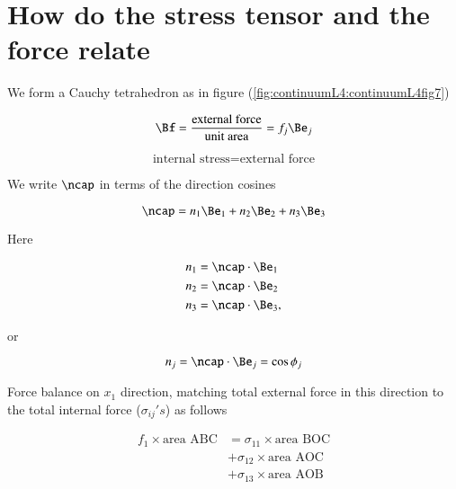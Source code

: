\section{How do the stress tensor and the force relate}

We form a Cauchy tetrahedron as in figure (\ref{fig:continuumL4:continuumL4fig7})

\begin{equation}\label{eqn:continuumL4:150}
\Bf = \frac{\text{external force}}{\text{unit area}} = f_j \Be_j
\end{equation}

\begin{equation}\label{eqn:continuumL4:170}
\text{internal stress} = \text{external force}
\end{equation}

We write $\ncap$ in terms of the direction cosines

\begin{equation}\label{eqn:continuumL4:190}
\ncap = 
n_1 \Be_1 + 
n_2 \Be_2 + 
n_3 \Be_3 
\end{equation}

Here 

\begin{align}\label{eqn:continuumL4:210}
n_1 &= \ncap \cdot \Be_1 \\
n_2 &= \ncap \cdot \Be_2 \\
n_3 &= \ncap \cdot \Be_3,
\end{align}

or 

\begin{equation}\label{eqn:continuumL4:230}
n_j = \ncap \cdot \Be_j = \cos\phi_j
\end{equation}

Force balance on $x_1$ direction, matching total external force in this direction to the total internal force ($\sigma_{ij}'s$) as follows

\begin{equation}\label{eqn:continuumL4:250}
\begin{aligned}
f_1 \times \text{area ABC} 
&= 
\sigma_{11} \times \text{area BOC} \\
&+\sigma_{12} \times \text{area AOC} \\
&+\sigma_{13} \times \text{area AOB}
\end{aligned}
\end{equation}

